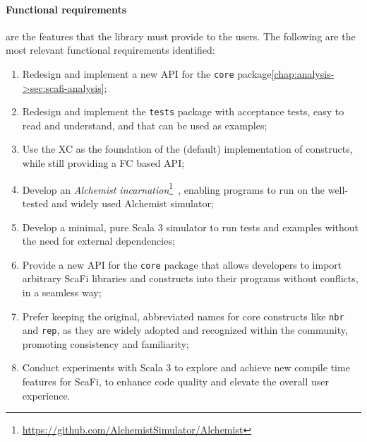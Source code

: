 \paragraph{Functional requirements} are the features that the library must provide to the users. The following are the most relevant functional requirements identified:
\begin{enumerate}[label=\textbf{F.\arabic*}]
    \item Redesign and implement a new \ac{API} for the \texttt{core} package\cref{chap:analysis->sec:scafi-analysis};
    \item Redesign and implement the \texttt{tests} package with acceptance tests, easy to read and understand, and that can be used as examples;
    \item Use the \ac{XC} as the foundation of the (default) implementation of constructs, while still providing a \ac{FC} based API;
    \item Develop an \textit{Alchemist incarnation}\footnote{\url{https://github.com/AlchemistSimulator/Alchemist}}~\cite{alchemist}, enabling \this programs to run on the well-tested and widely used Alchemist simulator;
    \item Develop a minimal, pure Scala 3 simulator to run tests and examples without the need for external dependencies;
    \item Provide a new API for the \texttt{core} package that allows developers to import arbitrary ScaFi libraries and constructs into their programs without conflicts, in a seamless way;
    \item Prefer keeping the original, abbreviated names for core constructs like \texttt{nbr} and \texttt{rep}, as they are widely adopted and recognized within the community, promoting consistency and familiarity;
    \item Conduct experiments with Scala 3 to explore and achieve new compile time features for ScaFi, to enhance code quality and elevate the overall user experience.
\end{enumerate}

